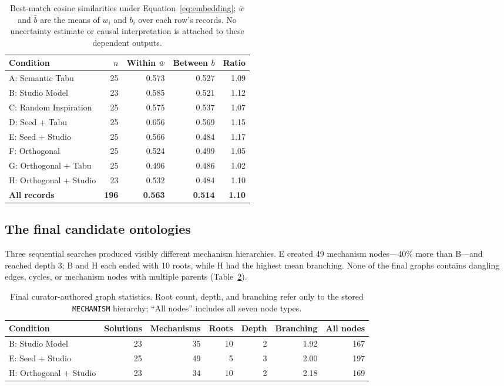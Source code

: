 \documentclass[11pt,a4paper]{article}
\begin{document}
\begin{table}[htbp]
\centering
\small
\begin{tabular}{lrrrr}
\toprule
\textbf{Condition} & \textbf{$n$} & \textbf{Within $\bar{w}$} & \textbf{Between $\bar{b}$} & \textbf{Ratio} \\
\midrule
A: Semantic Tabu       & 25 & 0.573 & 0.527 & 1.09 \\
B: Studio Model        & 23 & 0.585 & 0.521 & 1.12 \\
C: Random Inspiration  & 25 & 0.575 & 0.537 & 1.07 \\
D: Seed + Tabu         & 25 & 0.656 & 0.569 & 1.15 \\
E: Seed + Studio       & 25 & 0.566 & 0.484 & 1.17 \\
F: Orthogonal          & 25 & 0.524 & 0.499 & 1.05 \\
G: Orthogonal + Tabu   & 25 & 0.496 & 0.486 & 1.02 \\
H: Orthogonal + Studio & 23 & 0.532 & 0.484 & 1.10 \\
\midrule
\textbf{All records}   & \textbf{196} & \textbf{0.563} & \textbf{0.514} & \textbf{1.10} \\
\bottomrule
\end{tabular}
\caption{Best-match cosine similarities under Equation~\ref{eq:embedding}; $\bar{w}$ and $\bar{b}$ are the means of $w_i$ and $b_i$ over each row's records. No uncertainty estimate or causal interpretation is attached to these dependent outputs.}
\label{tab:embedding-results}
\end{table}

\subsection{The final candidate ontologies}

Three sequential searches produced visibly different mechanism hierarchies. E created 49 mechanism nodes---40\% more than B---and reached depth 3; B and H each ended with 10 roots, while H had the highest mean branching. None of the final graphs contains dangling edges, cycles, or mechanism nodes with multiple parents (Table~\ref{tab:graph-stats}).

\begin{table}[htbp]
\centering
\small
\begin{tabular}{lrrrrrr}
\toprule
\textbf{Condition} & \textbf{Solutions} & \textbf{Mechanisms} & \textbf{Roots} & \textbf{Depth} & \textbf{Branching} & \textbf{All nodes} \\
\midrule
B: Studio Model        & 23 & 35 & 10 & 2 & 1.92 & 167 \\
E: Seed + Studio       & 25 & 49 &  5 & 3 & 2.00 & 197 \\
H: Orthogonal + Studio & 23 & 34 & 10 & 2 & 2.18 & 169 \\
\bottomrule
\end{tabular}
\caption{Final curator-authored graph statistics. Root count, depth, and branching refer only to the stored \texttt{MECHANISM} hierarchy; ``All nodes'' includes all seven node types.}
\label{tab:graph-stats}
\end{table}
\end{document}
